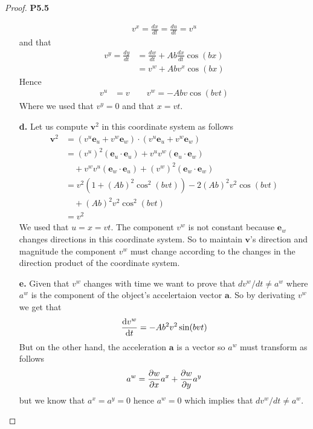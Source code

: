 \documentclass[11pt]{article}
\theoremstyle{definition}
\begin{document}
\begin{proof}{\textbf{P5.5}}
\begin{itemize}
\begin{align*}
            v^x = \frac{dx}{dt} = \frac{du}{dt} = v^u
        \end{align*}
        and that
        \begin{align*}
            v^y = \frac{dy}{dt} &= \frac{dw}{dt}
            + Ab \frac{dx}{dt}\cos(bx)\\
            &= v^w + Ab v^x\cos(bx)
        \end{align*}
        Hence
        \begin{align*}
            v^u &= v\quad\quad
            v^w = - Ab v\cos\left(bvt\right)
        \end{align*}
        Where we used that $v^y = 0$ and that $x = vt$.
        \item[\bf{d.}] Let us compute $\bm{v}^2$ in this coordinate system as follows
        \begin{align*}
            \bm{v}^2 &= (v^u \bm{e}_u + v^w \bm{e}_w) \cdot (v^u \bm{e}_u + v^w \bm{e}_w)\\
                &= (v^u)^2 (\bm{e}_u \cdot \bm{e}_u)
                + v^uv^w (\bm{e}_u \cdot \bm{e}_w)\\
                &\quad+ v^wv^u (\bm{e}_w \cdot \bm{e}_u)
                + (v^w)^2 (\bm{e}_w \cdot \bm{e}_w)\\
                &= v^2(1 + (Ab)^2\cos^2(bvt)) -2 (Ab)^2v^2\cos(bvt)\\
                &\quad + (Ab)^2v^2\cos^2(bvt)\\
                &= v^2
        \end{align*}
        We used that $u = x = vt$.
        The component $v^w$ is not constant because $\bm{e}_w$ changes
        directions in this coordinate system. So to maintain $\bm{v}$'s direction
        and magnitude the component $v^w$ must change according to the changes
        in the direction product of the coordinate system.
\cleardoublepage
        \item[\bf{e.}] Given that $v^w$ changes with time we want to prove that
        $dv^w/dt \neq a^w$ where $a^w$ is the component of the object's
        accelertaion vector $\bm{a}$.
        So by derivating $v^w$ we get that
        $$\derivative{v^w}{t} = -Ab^2v^2\sin(bvt)$$
        But on the other hand, the acceleration $\bm{a}$ is a vector so $a^w$
        must transform as follows
        \begin{align*}
            a^w = \partialderivative{w}{x}a^x + \partialderivative{w}{y}a^y
        \end{align*}
        but we know that $a^x = a^y = 0$ hence $a^w = 0$ which implies that
        $dv^w/dt \neq a^w$.
    \end{itemize}
\end{proof}
\end{document}
